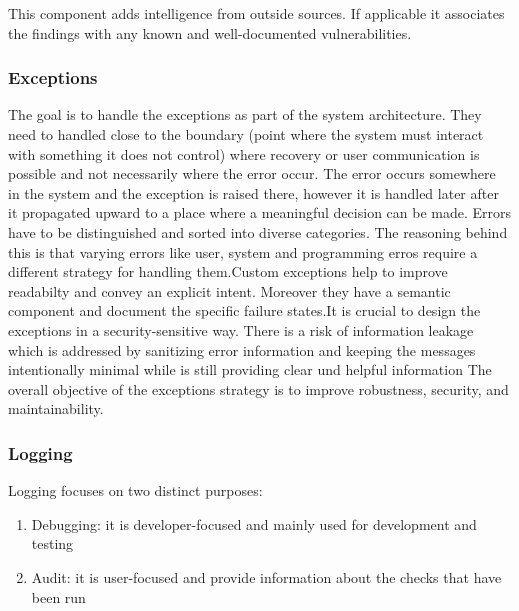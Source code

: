 This component adds intelligence from outside sources. If applicable it associates the findings with any known and well-documented vulnerabilities.

\subsubsection{Exceptions}

The goal is to handle the exceptions as part of the system architecture. They need to handled close to the boundary (point where the system must interact with something it does not control) where recovery or user communication is possible and not necessarily where the error occur. The error occurs somewhere in the system and the exception is raised there, however it is handled later after it propagated upward to a place where a meaningful decision can be made. \newline\newline Errors have to be distinguished and sorted into diverse categories. The reasoning behind this is that varying errors like user, system and programming erros require a different strategy for handling them.\newline\newline Custom exceptions help to improve readabilty and convey an explicit intent. Moreover they have a semantic component and document the specific failure states.\newline\newline It is crucial to design the exceptions in a security-sensitive way. There is a risk of information leakage which is addressed by sanitizing error information and keeping the messages intentionally minimal while is still providing clear und helpful information \newline\newline The overall objective of the exceptions strategy is to improve robustness, security, and maintainability.

\subsubsection{Logging}

Logging focuses on two distinct purposes:

\begin{enumerate}
	\item Debugging: it is developer-focused and mainly used for development and testing
	\item Audit: it is user-focused and provide information about the checks that have been run
\end{enumerate}

